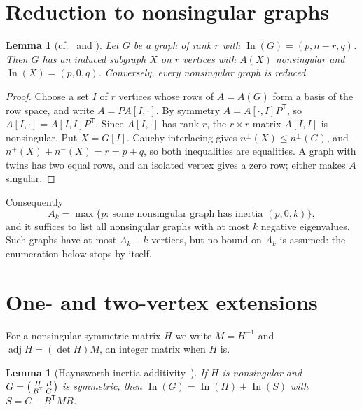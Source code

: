 \documentclass[11pt]{amsart}
\newtheorem{lemma}[theorem]{Lemma}
\theoremstyle{definition}
\theoremstyle{remark}
\newcommand{\In}{\operatorname{In}}
\newcommand{\adj}{\operatorname{adj}}
\begin{document}
\section{Reduction to nonsingular graphs}\label{sec:reduction}

\begin{lemma}[cf.~\cite{Ellingham1993} and {\cite[Lemma~2.3]{EKPS2026}}]\label{lem:basis}
Let $G$ be a graph of rank $r$ with $\In(G)=(p,n-r,q)$. Then $G$ has an induced subgraph $X$ on $r$ vertices with $A(X)$ nonsingular and $\In(X)=(p,0,q)$. Conversely, every nonsingular graph is reduced.
\end{lemma}

\begin{proof}
Choose a set $I$ of $r$ vertices whose rows of $A=A(G)$ form a basis of the row space, and write $A=PA[I,\cdot]$. By symmetry $A=A[\cdot,I]P^{\mathsf T}$, so $A[I,\cdot]=A[I,I]P^{\mathsf T}$. Since $A[I,\cdot]$ has rank $r$, the $r\times r$ matrix $A[I,I]$ is nonsingular. Put $X=G[I]$. Cauchy interlacing gives $n^\pm(X)\le n^\pm(G)$, and $n^+(X)+n^-(X)=r=p+q$, so both inequalities are equalities. A graph with twins has two equal rows, and an isolated vertex gives a zero row; either makes $A$ singular.
\end{proof}

Consequently
\begin{equation}\label{eq:Ak}
A_k=\max\{p:\ \text{some nonsingular graph has inertia }(p,0,k)\},
\end{equation}
and it suffices to list all nonsingular graphs with at most $k$ negative eigenvalues. Such graphs have at most $A_k+k$ vertices, but no bound on $A_k$ is assumed: the enumeration below stops by itself.

\section{One- and two-vertex extensions}\label{sec:closure}

For a nonsingular symmetric matrix $H$ we write $M=H^{-1}$ and $\adj H=(\det H)M$, an integer matrix when $H$ is.

\begin{lemma}[Haynsworth inertia additivity~\cite{Haynsworth1968}]\label{lem:schur}
If $H$ is nonsingular and $G=\begin{psmallmatrix}H&B\\B^{\mathsf T}&C\end{psmallmatrix}$ is symmetric, then $\In(G)=\In(H)+\In(S)$ with $S=C-B^{\mathsf T}MB$.
\end{lemma}
\end{document}
